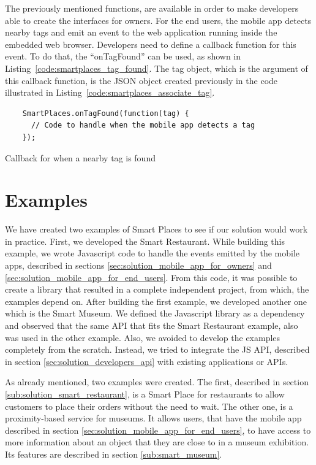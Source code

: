 The previously mentioned functions, are available in order to make developers able to create the interfaces for owners.
For the end users, the mobile app detects nearby tags and emit an event to the web application running inside the embedded web browser.
Developers need to define a callback function for this event.
To do that, the ``onTagFound'' can be used, as shown in Listing~\ref{code:smartplaces_tag_found}.
The tag object, which is the argument of this callback function, is the \gls{JSON} object created previously in the code illustrated in Listing~\ref{code:smartplaces_associate_tag}.

\begin{listing}[H]
  \begin{verbatim}
    SmartPlaces.onTagFound(function(tag) {
      // Code to handle when the mobile app detects a tag
    });
  \end{verbatim}
  \caption[Defining a callback for when a tag is found]{Callback for when a nearby tag is found}
  \label{code:smartplaces_tag_found}
\end{listing}

\section{Examples}
\label{sec:solution_examples}
We have created two examples of Smart Places to see if our solution would work in practice.
First, we developed the Smart Restaurant.
While building this example, we wrote Javascript code to handle the events emitted by the mobile apps, described in sections \ref{sec:solution_mobile_app_for_owners} and \ref{sec:solution_mobile_app_for_end_users}.
From this code, it was possible to create a library that resulted in a complete independent project, from which, the examples depend on.
After building the first example, we developed another one which is the Smart Museum.
We defined the Javascript library as a dependency and observed that the same \gls{API} that fits the Smart Restaurant example, also was used in the other example.
Also, we avoided to develop the examples completely from the scratch.
Instead, we tried to integrate the \gls{JS} \gls{API}, described in section \ref{sec:solution_developers_api} with existing applications or \glspl{API}.

As already mentioned, two examples were created.
The first, described in section \ref{sub:solution_smart_restaurant}, is a Smart Place for restaurants to allow customers to place their orders without the need to wait.
The other one, is a proximity-based service for museums.
It allows users, that have the mobile app described in section \ref{sec:solution_mobile_app_for_end_users}, to have access to more information about an object that they are close to in a museum exhibition.
Its features are described in section \ref{sub:smart_museum}.

